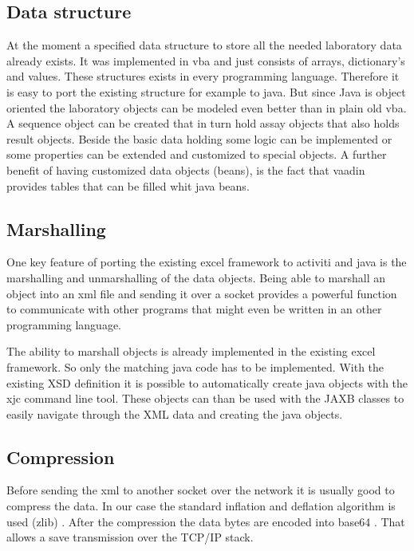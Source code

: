 \documentclass[paper=a4,twoside=false,BCOR=0mm,DIV=calc,fontsize=12pt]{scrartcl}
\begin{document}
\subsection{Data structure}
At the moment a specified data structure to store all the needed laboratory data already exists. It was implemented in vba and just consists of
arrays, dictionary's and values. These structures exists in every programming language. Therefore it is easy to port the existing structure for
example to java. But since Java is object oriented the laboratory objects can be modeled even better than in plain old vba. A sequence object can be
created that in turn hold assay objects that also holds result objects. Beside the basic data holding some logic can be implemented or some properties
can be extended and customized to special objects. A further benefit of having customized data objects (beans), is the fact that vaadin provides
tables that can be filled whit java beans.




\subsection{Marshalling}
One key feature of porting the existing excel framework to activiti and java is the marshalling and unmarshalling of the data objects.
Being able to marshall an object into an xml file and sending it over a socket provides a powerful function to communicate with other programs that
might even be written in an other programming language.

The ability to marshall objects is already implemented in the existing excel framework. So only the matching java code has to be implemented.
With the existing XSD definition it is possible to automatically create java objects with the xjc \cite{xjc} command line tool.
These objects can than be used with the JAXB \cite{jaxb} classes to easily navigate through the XML data and creating the java objects.



\subsection{Compression}
Before sending the xml to another socket over the network it is usually good to compress the data.
In our case the standard inflation and deflation algorithm is used (zlib) \cite{zlib}. After the compression 
the data bytes are encoded into base64 \cite{base64}. That allows a save transmission over the TCP/IP stack.
\end{document}
